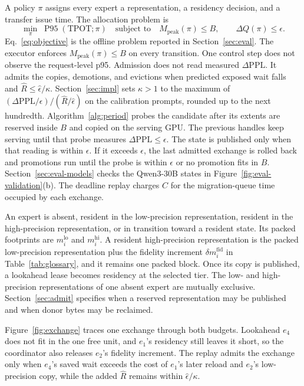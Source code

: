A policy \(\pi\) assigns every expert a representation, a residency decision, and a transfer issue time.
The allocation problem is
\begin{equation}
  \min_{\pi}\; \operatorname{P95}(\mathrm{TPOT};\pi)
  \quad \text{subject to} \quad
  M_{\mathrm{peak}}(\pi) \le B,
  \qquad
  \Delta Q(\pi) \le \epsilon.
  \label{eq:objective}
\end{equation}
Eq.~\eqref{eq:objective} is the offline problem reported in Section~\ref{sec:eval}.
The executor enforces \(M_{\mathrm{peak}}(\pi)\le B\) on every transition.
One control step does not observe the request-level p95.
Admission does not read measured \(\Delta\mathrm{PPL}\).
It admits the copies, demotions, and evictions when predicted exposed wait falls and \(\widehat R\le\widehat\epsilon/\kappa\).
Section~\ref{sec:impl} sets \(\kappa>1\) to the maximum of \((\Delta\mathrm{PPL}/\epsilon)/(\widehat R/\widehat\epsilon)\) on the calibration prompts, rounded up to the next hundredth.
Algorithm~\ref{alg:period} probes the candidate after its extents are reserved inside \(B\) and copied on the serving GPU. The previous handles keep serving until that probe measures \(\Delta\mathrm{PPL}\le\epsilon\).
The state is published only when that reading is within \(\epsilon\).
If it exceeds \(\epsilon\), the last admitted exchange is rolled back and promotions run until the probe is within \(\epsilon\) or no promotion fits in \(B\).
Section~\ref{sec:eval-models} checks the Qwen3-30B states in Figure~\ref{fig:eval-validation}(b).
The deadline replay charges \(C\) for the migration-queue time occupied by each exchange.

An expert is absent, resident in the low-precision representation, resident in the high-precision representation, or in transition toward a resident state.
Its packed footprints are \(m_i^{\mathrm{lo}}\) and \(m_i^{\mathrm{hi}}\).
A resident high-precision representation is the packed low-precision representation plus the fidelity increment \(\delta m_i^{\mathrm{fid}}\) in Table~\ref{tab:glossary}, and it remains one packed block.
Once its copy is published, a lookahead lease becomes residency at the selected tier.
The low- and high-precision representations of one absent expert are mutually exclusive.
Section~\ref{sec:admit} specifies when a reserved representation may be published and when donor bytes may be reclaimed.

Figure~\ref{fig:exchange} traces one exchange through both budgets.
Lookahead \(e_4\) does not fit in the one free unit, and \(e_1\)'s residency still leaves it short, so the coordinator also releases \(e_2\)'s fidelity increment.
The replay admits the exchange only when \(e_4\)'s saved wait exceeds the cost of \(e_1\)'s later reload and \(e_2\)'s low-precision copy, while the added \(\widehat R\) remains within \(\widehat\epsilon/\kappa\).

